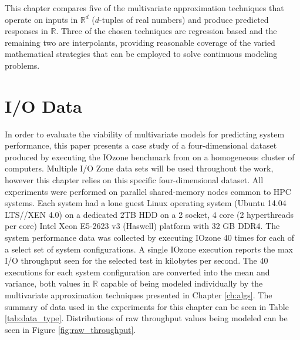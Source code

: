 
This chapter compares five of the multivariate approximation
techniques that operate on inputs in $\mathbb{R}^d$ ($d$-tuples of
real numbers) and produce predicted responses in $\mathbb{R}$. Three
of the chosen techniques are regression based and the remaining two
are interpolants, providing reasonable coverage of the varied
mathematical strategies that can be employed to solve continuous
modeling problems.

\section{I/O Data}

In order to evaluate the viability of multivariate models for
predicting system performance, this paper presents a case study of a
four-dimensional dataset produced by executing the IOzone benchmark
from \citet{iozone} on a homogeneous cluster of computers. Multiple
I/O Zone data sets will be used throughout the work, however this
chapter relies on this specific four-dimensional dataset. All
experiments were performed on parallel shared-memory nodes common to
HPC systems. Each system had a lone guest Linux operating system
(Ubuntu 14.04 LTS//XEN 4.0) on a dedicated 2TB HDD on a 2 socket, 4
core (2 hyperthreads per core) Intel Xeon E5-2623 v3 (Haswell)
platform with 32 GB DDR4. The system performance data was collected by
executing IOzone 40 times for each of a select set of system
configurations. A single IOzone execution reports the max I/O
throughput seen for the selected test in kilobytes per second. The 40
executions for each system configuration are converted into the mean
and variance, both values in $\mathbb{R}$ capable of being modeled
individually by the multivariate approximation techniques presented in
Chapter \ref{ch:algs}. The summary of data used in the experiments for
this chapter can be seen in Table \ref{tab:data_type}.  Distributions
of raw throughput values being modeled can be seen in Figure
\ref{fig:raw_throughput}.

